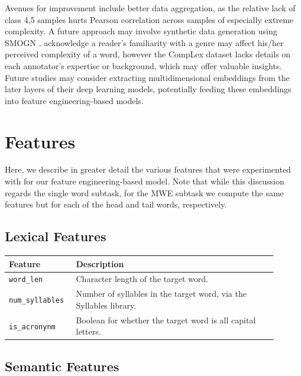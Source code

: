 \documentclass{dcthesis}
\theoremstyle{definition}
\theoremstyle{remark}
\begin{document}
Avenues for improvement include better data aggregation, as the relative lack of class 4,5 samples hurts Pearson correlation across samples of especially extreme complexity. A future approach may involve synthetic data generation using SMOGN \citep{pmlrv74branco17a}. \citet{shardlow2020complex} acknowledge a reader's familiarity with a genre may affect his/her perceived complexity of a word, however the CompLex dataset lacks details on each annotator's expertise or background, which may offer valuable insights. Future studies may consider extracting multidimensional embeddings from the later layers of their deep learning models, potentially feeding these embeddings into feature engineering-based models.

\appendix

\chapter{Features}

Here, we describe in greater detail the various features that were experimented with for our feature engineering-based model. Note that while this discussion regards the single word subtask, for the MWE subtask we compute the same features but for each of the head and tail words, respectively.

\section{Lexical Features}

\begin{table}[H]
  \centering
  \begin{tabular}{>{\centering\arraybackslash}p{0.2\linewidth}>{\arraybackslash}p{0.7\linewidth}}
    \hline \textbf{Feature} & \textbf{Description} \\ \hline 
    \texttt{word\_len} & Character length of the target word.\\
    \hline 
    \texttt{num\_syllables} & Number of syllables in the target word, via the Syllables library.\\
    \hline 
    \texttt{is\_acronynm} & Boolean for whether the target word is all capital letters.\\
    \hline 
  \end{tabular}
  \label{lexical_features}
\end{table}

\section{Semantic Features}
\end{document}
